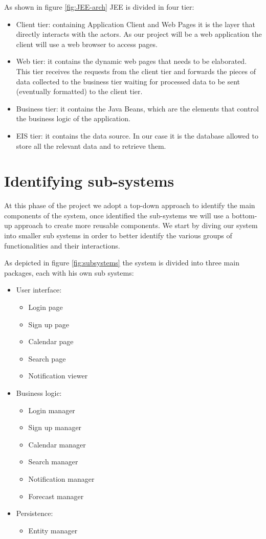 \documentclass[10pt,a4paper,titlepage]{article}
\begin{document}
As shown in figure \ref{fig:JEE-arch} JEE is divided in four tier:
\begin{itemize}
\item Client tier: containing Application Client and Web Pages it is the layer that directly interacts with the actors. As our project will be a web application the client will use a web browser to access pages.
\item Web tier: it contains the dynamic web pages that needs to be elaborated. This tier receives the requests from the client tier and forwards the pieces of data collected to the business tier waiting for processed data to be sent (eventually formatted) to the client tier.
\item Business tier: it contains the Java Beans, which are the elements that control the business logic of the application.
\item EIS tier: it contains the data source. In our case it is the database allowed to store all the relevant data and to retrieve them.
\end{itemize}

\section{Identifying sub-systems}
At this phase of the project we adopt a top-down approach to identify the main components of the system, once identified the sub-systems we will use a bottom-up approach to create more reusable components. We start by diving our system into smaller sub systems in order to better identify the various groups of functionalities and their interactions.

As depicted in figure \ref{fig:subsystems} the system is divided into three main packages, each with his own sub systems:
\begin{itemize}
\item User interface:
\begin{itemize}
\item Login page
\item Sign up page
\item Calendar page
\item Search page
\item Notification viewer
\end{itemize}

\item Business logic:
\begin{itemize}
\item Login manager
\item Sign up manager
\item Calendar manager
\item Search manager
\item Notification manager
\item Forecast manager
\end{itemize}

\item Persistence:
\begin{itemize}
\item Entity manager
\end{itemize}
\end{itemize}
\end{document}

